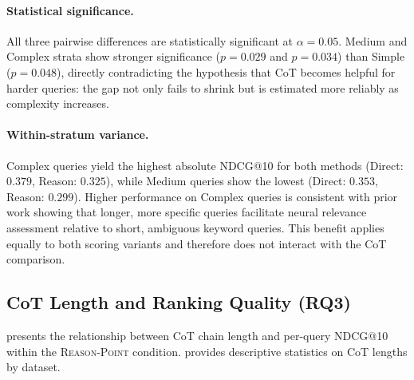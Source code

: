 \documentclass[12pt]{article}
\makeatletter
\newcommand{\ndcg}{NDCG@10}
\newcommand{\reason}{\textsc{Reason-Point}}
\newcommand{\CoT}{CoT}
\makeatother
\begin{document}
\paragraph{Statistical significance.}
All three pairwise differences are statistically significant at $\alpha=0.05$.
Medium and Complex strata show stronger significance ($p=0.029$ and $p=0.034$)
than Simple ($p=0.048$), directly contradicting the hypothesis that \CoT{}
becomes helpful for harder queries: the gap not only fails to shrink but is
estimated more reliably as complexity increases.

\paragraph{Within-stratum variance.}
Complex queries yield the highest absolute \ndcg{} for both methods (Direct:
$0.379$, Reason: $0.325$), while Medium queries show the lowest (Direct:
$0.353$, Reason: $0.299$).  Higher performance on Complex queries is consistent
with prior work showing that longer, more specific queries facilitate neural
relevance assessment relative to short, ambiguous keyword queries.  This
benefit applies equally to both scoring variants and therefore does not
interact with the \CoT{} comparison.

\subsection{CoT Length and Ranking Quality (RQ3)}
\label{sec:length_results}

 presents the relationship between CoT chain length and
per-query \ndcg{} within the \reason{} condition.  
provides descriptive statistics on CoT lengths by dataset.
\end{document}
